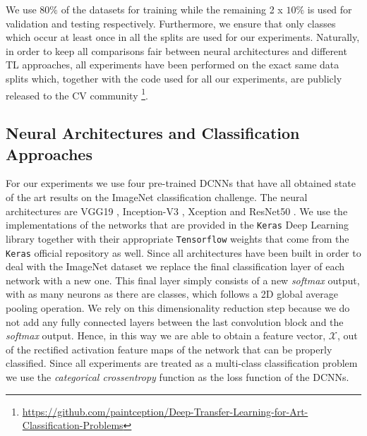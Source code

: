\documentclass[runningheads]{llncs}
\begin{document}
We use $80\%$ of the datasets for training while the remaining 2 x $10\%$ is used for validation and testing respectively. Furthermore, we ensure that only classes which occur at least once in all the splits are used for our experiments. Naturally, in order to keep all comparisons fair between neural architectures and different TL approaches, all experiments have been performed on the exact same data splits which, together with the code used for all our experiments, are publicly released to the CV community \footnote{\url{https://github.com/paintception/Deep-Transfer-Learning-for-Art-Classification-Problems}}. 

\subsection{Neural Architectures and Classification Approaches}
\label{subsec: neural_nets}

For our experiments we use four pre-trained DCNNs that have all obtained state of the art results on the ImageNet classification challenge. The neural architectures are VGG19 \cite{simonyan2014very}, Inception-V3 \cite{szegedy2016rethinking}, Xception \cite{chollet2016xception} and ResNet50 \cite{xie2017aggregated}. We use the implementations of the networks that are provided in the \verb#Keras# Deep Learning library \cite{chollet2015keras} together with their appropriate \verb#Tensorflow# weights \cite{abadi2016tensorflow} that come from the \verb#Keras# official repository as well. Since all architectures have been built in order to deal with the ImageNet dataset we replace the final classification layer of each network with a new one. This final layer simply consists of a new \textit{softmax} output, with as many neurons as there are classes, which follows a 2D global average pooling operation. We rely on this dimensionality reduction step because we do not add any fully connected layers between the last convolution block and the \textit{softmax} output. Hence, in this way we are able to obtain a feature vector, $\mathcal{X}$, out of the rectified activation feature maps of the network that can be properly classified. Since all experiments are treated as a multi-class classification problem we use the \textit{categorical crossentropy} function as the loss function of the DCNNs.
\end{document}
